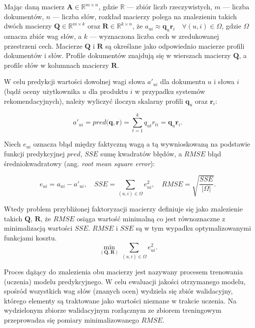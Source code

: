 \documentclass{pracamgr}
\newcommand{\abs}[1]{\lvert#1\rvert}
\begin{document}
Mając daną macierz $\mathbf{A} \in \mathbb{R}^{m \times n}$, gdzie $\mathbb{R}$ --- zbiór liczb rzeczywistych, $m$ --- liczba dokumentów, $n$ --- liczba słów, rozkład macierzy polega na znalezieniu takich dwóch macierzy $\mathbf{Q} \in \mathbb{R}^{m \times k}$ oraz $\mathbf{R} \in \mathbb{R}^{k \times n}$, że $a_{ui} \approx \mathbf{q}_{u} \mathbf{r}_{i} \quad \forall (u, i) \in \Omega$, gdzie $\Omega$ oznacza zbiór wag słów, a $k$ --- wyznaczona liczba cech w zredukowanej przestrzeni cech. Macierze $\mathbf{Q}$ i $\mathbf{R}$ są określane jako odpowiednio macierze profili dokumentów i słów. Profile dokumentów znajdują się w wierszach macierzy $\mathbf{Q}$, a profile słów w kolumnach macierzy $\mathbf{R}$.

W celu predykcji wartości dowolnej wagi słowa $a'_{ui}$ dla dokumentu $u$ i słowa $i$ (bądź oceny użytkownika $u$ dla produktu $i$ w przypadku systemów rekomendacyjnych), należy wyliczyć iloczyn skalarny profili $\mathbf{q}_{u}$ oraz $\mathbf{r}_{i}$:

\[
a'_{ui} = pred(\mathbf{q}, \mathbf{r)} = \sum_{t=1}^{k} q_{ut} r_{ti} = \mathbf{q}_{u} \mathbf{r}_{i}.
\]

Niech $e_{ui}$ oznacza błąd między faktyczną wagą a tą wywnioskowaną na podstawie funkcji predykcyjnej $pred$, $SSE$ sumę kwadratów błędów, a $RMSE$ błąd średniokwadratowy (ang. \textit{root mean square error}):

\[
e_{ui} = a_{ui} - a'_{ui}, \quad SSE = \sum_{(u,i) \in \Omega} e_{ui}^2, \quad RMSE = \sqrt{\frac{SSE}{\abs{\Omega}}}.
\]

Wtedy problem przybliżonej faktoryzacji macierzy definiuje się jako znalezienie takich $\mathbf{Q}$, $\mathbf{R}$, że $RMSE$ osiąga wartość minimalną co jest równoznaczne z minimalizacją wartości $SSE$. $RMSE$ i $SSE$ są w tym wypadku optymalizowanymi funkcjami kosztu.
\[
\min_{(\mathbf{Q}, \mathbf{R})} \sum_{(u,i) \in \Omega} e_{ui}^2.
\]

Proces dążący do znalezienia obu macierzy jest nazywany procesem trenowania (uczenia) modelu predykcyjnego. W celu ewaluacji jakości otrzymanego modelu, spośród wszystkich wag słów (znanych ocen) wydziela się zbiór walidacyjny, którego elementy są traktowane jako wartości nieznane w trakcie uczenia. Na wydzielonym zbiorze walidacyjnym rozłącznym ze zbiorem treningowym przeprowadza się pomiary minimalizowanego $RMSE$.
\end{document}
